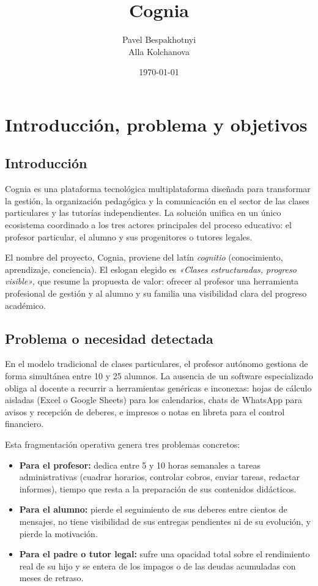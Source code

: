 \documentclass[12pt,a4paper]{report}
\begin{document}
\title{Cognia}
\author{Pavel Bespakhotnyi \\ Alla Kolchanova}
\date{\today}
\maketitle

\tableofcontents

\chapter{Introducción, problema y objetivos}

\section{Introducción}

Cognia es una plataforma tecnológica multiplataforma diseñada para
transformar la gestión, la organización pedagógica y la comunicación en
el sector de las clases particulares y las tutorías independientes. La
solución unifica en un único ecosistema coordinado a los tres actores
principales del proceso educativo: el profesor particular, el alumno y
sus progenitores o tutores legales.

El nombre del proyecto, Cognia, proviene del latín \textit{cognitio}
(conocimiento, aprendizaje, conciencia). El eslogan elegido es
\textit{«Clases estructuradas, progreso visible»}, que resume la
propuesta de valor: ofrecer al profesor una herramienta profesional de
gestión y al alumno y su familia una visibilidad clara del progreso
académico.

\section{Problema o necesidad detectada}

En el modelo tradicional de clases particulares, el profesor autónomo
gestiona de forma simultánea entre 10 y 25 alumnos. La ausencia de un
software especializado obliga al docente a recurrir a herramientas
genéricas e inconexas: hojas de cálculo aisladas (Excel o Google Sheets)
para los calendarios, chats de WhatsApp para avisos y recepción de
deberes, e impresos o notas en libreta para el control financiero.

Esta fragmentación operativa genera tres problemas concretos:

\begin{itemize}
    \item \textbf{Para el profesor:} dedica entre 5 y 10 horas semanales
    a tareas administrativas (cuadrar horarios, controlar cobros, enviar
    tareas, redactar informes), tiempo que resta a la preparación de sus
    contenidos didácticos.
    \item \textbf{Para el alumno:} pierde el seguimiento de sus deberes
    entre cientos de mensajes, no tiene visibilidad de sus entregas
    pendientes ni de su evolución, y pierde la motivación.
    \item \textbf{Para el padre o tutor legal:} sufre una opacidad total
    sobre el rendimiento real de su hijo y se entera de los impagos o de
    las deudas acumuladas con meses de retraso.
\end{itemize}
\end{document}
